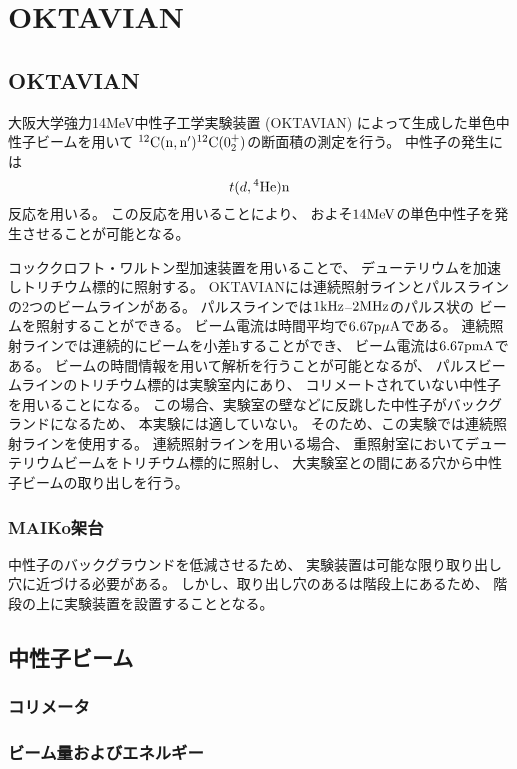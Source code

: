 \documentclass[master]{subfiles}
\begin{document}
\chapter{OKTAVIAN}
\section{OKTAVIAN}
大阪大学強力14MeV中性子工学実験装置 (OKTAVIAN) によって生成した単色中性子ビームを用いて
${}^{12}\rm{C}(n,n'){}^{12}\rm{C}(0_{2}^{+})$の断面積の測定を行う。
中性子の発生には
\begin{equation}
  t(d,{}^{4}\rm{He})n
\end{equation}
反応を用いる。
この反応を用いることにより、
およそ$14\rm{MeV}$の単色中性子を発生させることが可能となる。

コッククロフト・ワルトン型加速装置を用いることで、
デューテリウムを加速しトリチウム標的に照射する。
OKTAVIANには連続照射ラインとパルスラインの2つのビームラインがある。
パルスラインでは$1\rm{kHz}$--$2\rm{MHz}$のパルス状の
ビームを照射することができる。
ビーム電流は時間平均で$6.67\rm{p\mu A}$である。
連続照射ラインでは連続的にビームを小差hすることができ、
ビーム電流は$6.67\rm{pmA}$である。
ビームの時間情報を用いて解析を行うことが可能となるが、
パルスビームラインのトリチウム標的は実験室内にあり、
コリメートされていない中性子を用いることになる。
この場合、実験室の壁などに反跳した中性子がバックグランドになるため、
本実験には適していない。
そのため、この実験では連続照射ラインを使用する。
連続照射ラインを用いる場合、
重照射室においてデューテリウムビームをトリチウム標的に照射し、
大実験室との間にある穴から中性子ビームの取り出しを行う。

\subsection{MAIKo架台}
中性子のバックグラウンドを低減させるため、
実験装置は可能な限り取り出し穴に近づける必要がある。
しかし、取り出し穴のあるは階段上にあるため、
階段の上に実験装置を設置することとなる。

\section{中性子ビーム}
\subsection{コリメータ}
\subsection{ビーム量およびエネルギー}
\end{document}
